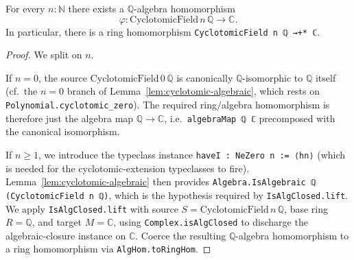\begin{lemma}
  \label{lem:cyclotomic-embed}
  \leanok
  For every $n : \mathbb{N}$ there exists a $\mathbb{Q}$-algebra homomorphism
  \[
    \varphi : \mathrm{CyclotomicField}\,n\,\mathbb{Q} \longrightarrow \mathbb{C}.
  \]
  In particular, there is a ring homomorphism \verb|CyclotomicField n ℚ →+* ℂ|.
\end{lemma}
\begin{proof}
  We split on $n$.

  If $n = 0$, the source $\mathrm{CyclotomicField}\,0\,\mathbb{Q}$ is canonically $\mathbb{Q}$-isomorphic to $\mathbb{Q}$ itself (cf.~the $n = 0$ branch of Lemma~\ref{lem:cyclotomic-algebraic}, which rests on \verb|Polynomial.cyclotomic_zero|).  The required ring/algebra homomorphism is therefore just the algebra map $\mathbb{Q} \to \mathbb{C}$, i.e.\ \verb|algebraMap ℚ ℂ| precomposed with the canonical isomorphism.

  If $n \geq 1$, we introduce the typeclass instance \verb|haveI : NeZero n := ⟨hn⟩| (which is needed for the cyclotomic-extension typeclasses to fire).  Lemma~\ref{lem:cyclotomic-algebraic} then provides \verb|Algebra.IsAlgebraic ℚ (CyclotomicField n ℚ)|, which is the hypothesis required by \verb|IsAlgClosed.lift|.  We apply \verb|IsAlgClosed.lift| with source $S = \mathrm{CyclotomicField}\,n\,\mathbb{Q}$, base ring $R = \mathbb{Q}$, and target $M = \mathbb{C}$, using \verb|Complex.isAlgClosed| to discharge the algebraic-closure instance on $\mathbb{C}$.  Coerce the resulting $\mathbb{Q}$-algebra homomorphism to a ring homomorphism via \verb|AlgHom.toRingHom|.
\end{proof}

